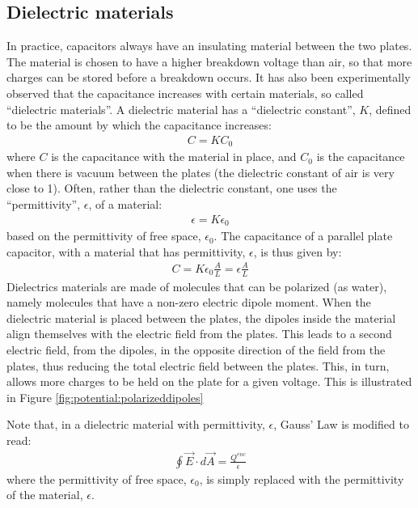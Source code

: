 \subsection{Dielectric materials}
In practice, capacitors always have an insulating material between the two plates. The material is chosen to have a higher breakdown voltage than air, so that more charges can be stored before a breakdown occurs. It has also been experimentally observed that the capacitance increases with certain materials, so called ``dielectric materials''. A dielectric material has a ``dielectric constant'', $K$, defined to be the amount by which the capacitance increases:
\begin{align*}
C=KC_0
\end{align*}
where $C$ is the capacitance with the material in place, and $C_0$ is the capacitance when there is vacuum between the plates (the dielectric constant of air is very close to 1). Often, rather than the dielectric constant, one uses the ``permittivity'', $\epsilon$, of a material:
\begin{align*}
\epsilon=K\epsilon_0
\end{align*}
based on the permittivity of free space, $\epsilon_0$. The capacitance of a parallel plate capacitor, with a material that has permittivity, $\epsilon$, is thus given by:
\begin{align*}
C=K\epsilon_0\frac{A}{L}=\epsilon\frac{A}{L}
\end{align*}
Dielectrics materials are made of molecules that can be polarized (as water), namely molecules that have a non-zero electric dipole moment. When the dielectric material is placed between the plates, the dipoles inside the material align themselves with the electric field from the plates. This leads to a second electric field, from the dipoles, in the opposite direction of the field from the plates, thus reducing the total electric field between the plates. This, in turn, allows more charges to be held on the plate for a given voltage. This is illustrated in Figure \ref{fig:potential:polarizeddipoles}


Note that, in a dielectric material with permittivity, $\epsilon$, Gauss' Law is modified to read:
\begin{align*}
\oint \vec E\cdot d\vec A=\frac{Q^{enc}}{\epsilon}
\end{align*}
where the permittivity of free space, $\epsilon_0$, is simply replaced with the permittivity of the material, $\epsilon$.

